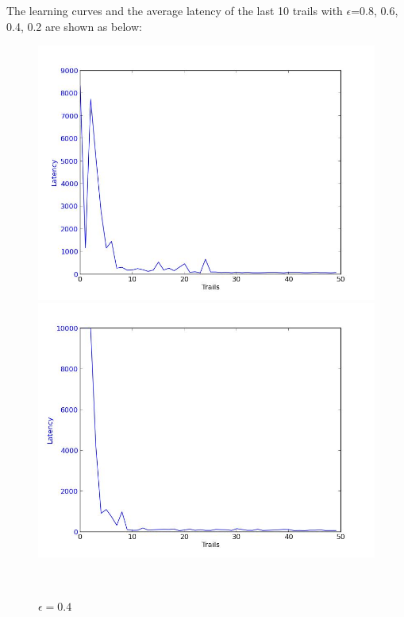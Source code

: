 \documentclass[a4paper, 12pt]{article}
\begin{document}
The learning curves and the average latency of the last 10 trails with $\epsilon$=0.8, 0.6, 0.4, 0.2 are shown as below:

\begin{figure}
  \centering
  \begin{minipage}[c]{0.5\textwidth}
    \centering
    \includegraphics[scale=0.3]{../figure/eps2.jpeg}
      \caption{$\epsilon = 0.2$}
  \end{minipage}%
  \begin{minipage}[c]{0.5\textwidth}
    \centering
    \includegraphics[scale=0.3]{../figure/eps4.jpeg}
      \caption{$\epsilon = 0.4$}
    \end{minipage}
    \\

\end{figure}
\end{document}
